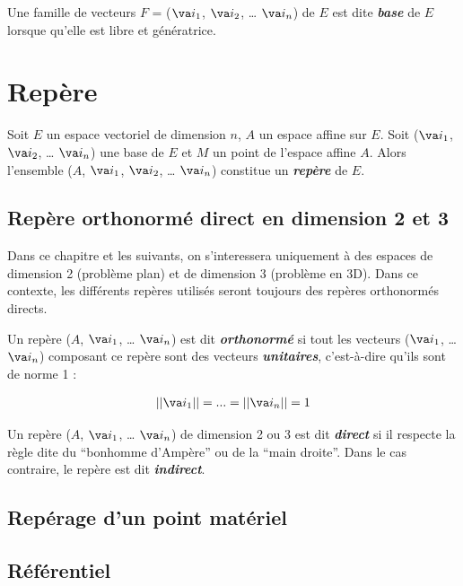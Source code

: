 \documentclass[
  12pt,
  openany]{book}
\theoremstyle{plain}
\theoremstyle{remark}
\begin{document}
Une famille de vecteurs \(F\) = (\(\va i_1\), \(\va i_2\), \ldots{}
\(\va i_n\)) de \(E\) est dite \textbf{\emph{base}} de \(E\) lorsque
qu'elle est libre et génératrice.

\chapter{Repère}\label{repuxe8re}

Soit \(E\) un espace vectoriel de dimension \(n\), \(A\) un espace
affine sur \(E\). Soit (\(\va i_1\), \(\va i_2\), \ldots{} \(\va i_n\))
une base de \(E\) et \(M\) un point de l'espace affine \(A\). Alors
l'ensemble (\(A\), \(\va i_1\), \(\va i_2\), \ldots{} \(\va i_n\))
constitue un \textbf{\emph{repère}} de \(E\).

\section{Repère orthonormé direct en dimension 2 et
3}\label{repuxe8re-orthonormuxe9-direct-en-dimension-2-et-3}

Dans ce chapitre et les suivants, on s'interessera uniquement à des
espaces de dimension 2 (problème plan) et de dimension 3 (problème en
3D). Dans ce contexte, les différents repères utilisés seront toujours
des repères orthonormés directs.

Un repère (\(A\), \(\va i_1\), \ldots{} \(\va i_n\)) est dit
\textbf{\emph{orthonormé}} si tout les vecteurs (\(\va i_1\), \ldots{}
\(\va i_n\)) composant ce repère sont des vecteurs
\textbf{\emph{unitaires}}, c'est-à-dire qu'ils sont de norme 1 :

\begin{align*}
 \left|\left|\va i_1\right|\right|= ... =\left|\left|\va i_n\right|\right|= 1
\end{align*}

Un repère (\(A\), \(\va i_1\), \ldots{} \(\va i_n\)) de dimension 2 ou 3
est dit \textbf{\emph{direct}} si il respecte la règle dite du
``bonhomme d'Ampère'' ou de la ``main droite''. Dans le cas contraire,
le repère est dit \textbf{\emph{indirect}}.

\section{Repérage d'un point
matériel}\label{repuxe9rage-dun-point-matuxe9riel}

\section{Référentiel}\label{ruxe9fuxe9rentiel}
\end{document}
